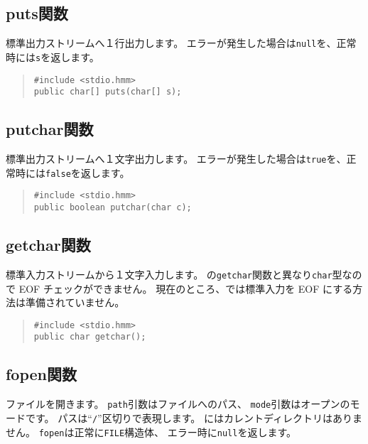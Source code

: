 \subsection{puts関数}

標準出力ストリームへ１行出力します。
エラーが発生した場合は\verb/null/を、正常時には\verb/s/を返します。

\begin{quote}
\begin{verbatim}
#include <stdio.hmm>
public char[] puts(char[] s);
\end{verbatim}
\end{quote}

\subsection{putchar関数}

標準出力ストリームへ１文字出力します。
エラーが発生した場合は\verb/true/を、正常時には\verb/false/を返します。

\begin{quote}
\begin{verbatim}
#include <stdio.hmm>
public boolean putchar(char c);
\end{verbatim}
\end{quote}

\subsection{getchar関数}

標準入力ストリームから１文字入力します。
\cl の\verb/getchar/関数と異なり\verb/char/型なので EOF チェックができません。
現在のところ、\tacos では標準入力を EOF にする方法は準備されていません。

\begin{quote}
\begin{verbatim}
#include <stdio.hmm>
public char getchar();
\end{verbatim}
\end{quote}

\subsection{fopen関数}

ファイルを開きます。
\verb/path/引数はファイルへのパス、
\verb/mode/引数はオープンのモードです。
パスは``\verb;/;''区切りで表現します。
\tacos にはカレントディレクトリはありません。
\verb/fopen/は正常に\verb/FILE/構造体、
エラー時に\verb/null/を返します。

